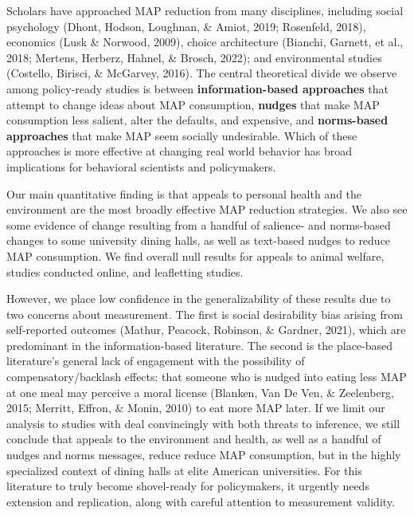 \documentclass[
  man]{apa6}
\begin{document}
Scholars have approached MAP reduction from many disciplines, including social psychology (Dhont, Hodson, Loughnan, \& Amiot, 2019; Rosenfeld, 2018), economics (Lusk \& Norwood, 2009), choice architecture (Bianchi, Garnett, et al., 2018; Mertens, Herberz, Hahnel, \& Brosch, 2022); and environmental studies (Costello, Birisci, \& McGarvey, 2016). The central theoretical divide we observe among policy-ready studies is between \textbf{information-based approaches} that attempt to change ideas about MAP consumption, \textbf{nudges} that make MAP consumption less salient, alter the defaults, and expensive, and \textbf{norms-based approaches} that make MAP seem socially undesirable. Which of these approaches is more effective at changing real world behavior has broad implications for behavioral scientists and policymakers.

Our main quantitative finding is that appeals to personal health and the environment are the most broadly effective MAP reduction strategies. We also see some evidence of change resulting from a handful of salience- and norms-based changes to some university dining halls, as well as text-based nudges to reduce MAP consumption. We find overall null results for appeals to animal welfare, studies conducted online, and leafletting studies.

However, we place low confidence in the generalizability of these results due to two concerns about measurement. The first is social desirability bias arising from self-reported outcomes (Mathur, Peacock, Robinson, \& Gardner, 2021), which are predominant in the information-based literature. The second is the place-based literature's general lack of engagement with the possibility of compensatory/backlash effects: that someone who is nudged into eating less MAP at one meal may perceive a moral license (Blanken, Van De Ven, \& Zeelenberg, 2015; Merritt, Effron, \& Monin, 2010) to eat more MAP later. If we limit our analysis to studies with deal convincingly with both threats to inference, we still conclude that appeals to the environment and health, as well as a handful of nudges and norms messages, reduce reduce MAP consumption, but in the highly specialized context of dining halls at elite American universities. For this literature to truly become shovel-ready for policymakers, it urgently needs extension and replication, along with careful attention to measurement validity.
\end{document}
